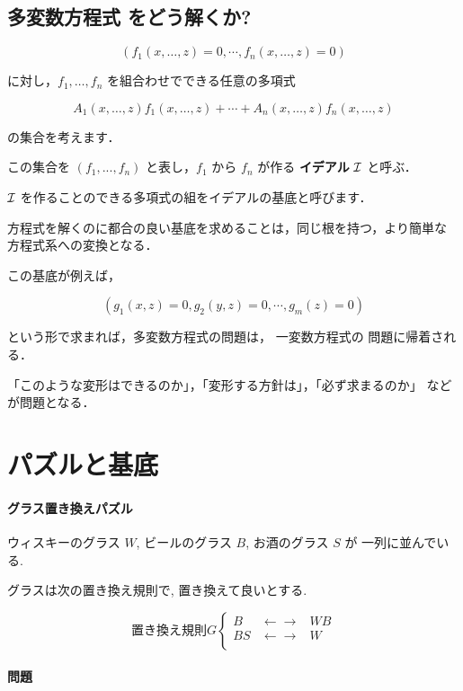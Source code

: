 \documentclass[a4j]{jarticle}
\begin{document}
\subsection{多変数方程式 をどう解くか?}
\label{sec:org50d01d1}

$$(f_1(x, \ldots, z) =0, \cdots, f_n(x, \ldots, z) =0)$$

に対し，\(f_1, \ldots, f_n\) を組合わせでできる任意の多項式

$$A_1(x, \ldots, z) f_1(x, \ldots, z) + \cdots + A_n(x, \ldots, z)
f_n(x, \ldots, z)$$

の集合を考えます．

この集合を \((f_1, ... , f_n)\) と表し，\(f_1\) から \(f_n\) が作る
\textbf{イデアル} \({\cal I}\) と呼ぶ．

\({\cal I}\) を作ることのできる多項式の組をイデアルの基底と呼びます．

方程式を解くのに都合の良い基底を求めることは，同じ根を持つ，より簡単な
方程式系への変換となる．

この基底が例えば，

$$(g_1(x, z) =0, g_2(y,z) = 0, \cdots, g_m(z) =0)$$

という形で求まれば，多変数方程式の問題は， 一変数方程式の
問題に帰着される．

「このような変形はできるのか」，「変形する方針は」，「必ず求まるのか」
などが問題となる．

\section{パズルと基底}
\label{sec:org9cc246b}

\paragraph{グラス置き換えパズル}
\label{sec:org51760fa}

ウィスキーのグラス \(W\), ビールのグラス \(B\), お酒のグラス \(S\) が
一列に並んでいる.

グラスは次の置き換え規則で, 置き換えて良いとする.

$$置き換え規則 G \left\{ \begin{array}{rll}
B &  \leftarrow\rightarrow  &  W B\\
BS& \leftarrow\rightarrow   & W  \\
      \end{array}
\right.$$

\paragraph{問題}
\label{sec:org2519068}
\end{document}
